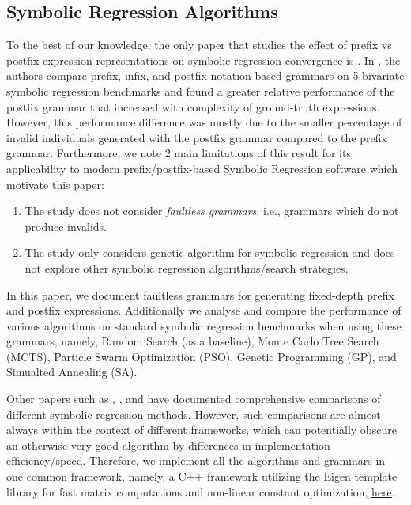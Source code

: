 \documentclass[12pt]{iopart}
\begin{document}
\subsection{Symbolic Regression Algorithms}
To the best of our knowledge, the only paper that studies the effect of prefix vs postfix expression representations on symbolic regression convergence is \cite{hemberg2008pre}.  In \cite{hemberg2008pre}, the authors compare prefix, infix, and postfix notation-based grammars on 5 bivariate symbolic regression benchmarks and found a greater relative performance of the postfix grammar that increased with complexity of ground-truth expressions. 
However, this performance difference was mostly due to the smaller percentage of invalid individuals generated with the postfix grammar compared to the prefix grammar.  
Furthermore, we note 2 main limitations of this result for its applicability to modern prefix/postfix-based Symbolic Regression software which motivate this paper:
\begin{enumerate}
\item The study does not consider \emph{faultless grammars}, i.e., grammars which do not produce invalids.
\item The study only considers genetic algorithm for symbolic regression and does not explore other symbolic regression algorithms/search strategies. 
\end{enumerate}
In this paper, we document faultless grammars for generating fixed-depth prefix and postfix expressions. Additionally we analyse and compare the performance of various algorithms on standard symbolic regression benchmarks when using these grammars, namely, Random Search (as a baseline), Monte Carlo Tree Search (MCTS), Particle Swarm Optimization (PSO), Genetic Programming (GP), and Simualted Annealing (SA). 
\par Other papers such as \cite{lacava2021contemporary}, \cite{10.1145/3205455.3205539}, and \cite{Zegklitz2021} have documented comprehensive comparisons of different symbolic regression methods. However, such comparisons are almost always within the context of different frameworks, which can potentially obscure an otherwise very good algorithm by differences in implementation efficiency/speed. Therefore, we implement all the algorithms and grammars in one common framework, namely, a C++ framework utilizing the Eigen template library  \cite{eigenweb} for fast matrix computations and non-linear constant optimization, \href{https://github.com/edfink234/Alpha-Zero-Symbolic-Regression/tree/prefix_and_postfix_cpp_implementation}{here}.
\end{document}
